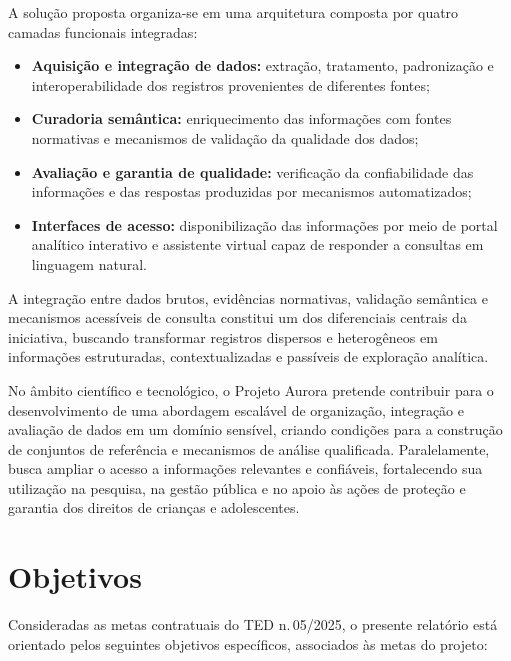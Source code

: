 \documentclass[11pt,a4paper]{article}
\begin{document}
A solução proposta organiza-se em uma arquitetura composta por quatro camadas funcionais integradas:
\begin{itemize}
    \item \textbf{Aquisição e integração de dados:} extração, tratamento, padronização e interoperabilidade dos registros provenientes de diferentes fontes;
    \item \textbf{Curadoria semântica:} enriquecimento das informações com fontes normativas e mecanismos de validação da qualidade dos dados;
    \item \textbf{Avaliação e garantia de qualidade:} verificação da confiabilidade das informações e das respostas produzidas por mecanismos automatizados;
    \item \textbf{Interfaces de acesso:} disponibilização das informações por meio de portal analítico interativo e assistente virtual capaz de responder a consultas em linguagem natural.
\end{itemize}

A integração entre dados brutos, evidências normativas, validação semântica e mecanismos acessíveis de consulta constitui um dos diferenciais centrais da iniciativa, buscando transformar registros dispersos e heterogêneos em informações estruturadas, contextualizadas e passíveis de exploração analítica.

No âmbito científico e tecnológico, o Projeto Aurora pretende contribuir para o desenvolvimento de uma abordagem escalável de organização, integração e avaliação de dados em um domínio sensível, criando condições para a construção de conjuntos de referência e mecanismos de análise qualificada. Paralelamente, busca ampliar o acesso a informações relevantes e confiáveis, fortalecendo sua utilização na pesquisa, na gestão pública e no apoio às ações de proteção e garantia dos direitos de crianças e adolescentes.

\clearpage
\section{Objetivos}
\label{sec:objetivos}

Consideradas as metas contratuais do TED n.\,05/2025, o presente relatório está orientado pelos seguintes objetivos específicos, associados às metas do projeto:
\end{document}
